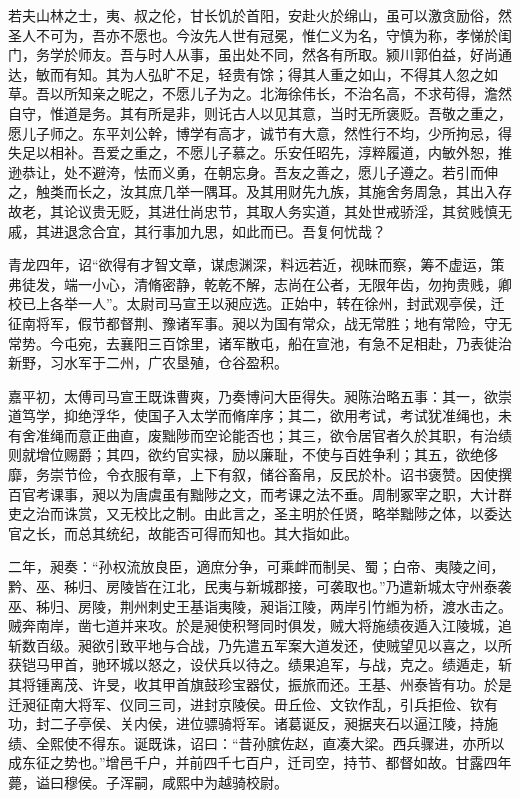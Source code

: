 \documentclass[12pt,UTF8]{ctexbook}
\begin{document}
若夫山林之士，夷、叔之伦，甘长饥於首阳，安赴火於绵山，虽可以激贪励俗，然圣人不可为，吾亦不愿也。今汝先人世有冠冕，惟仁义为名，守慎为称，孝悌於闺门，务学於师友。吾与时人从事，虽出处不同，然各有所取。颍川郭伯益，好尚通达，敏而有知。其为人弘旷不足，轻贵有馀；得其人重之如山，不得其人忽之如草。吾以所知亲之昵之，不愿儿子为之。北海徐伟长，不治名高，不求苟得，澹然自守，惟道是务。其有所是非，则讬古人以见其意，当时无所褒贬。吾敬之重之，愿儿子师之。东平刘公幹，博学有高才，诚节有大意，然性行不均，少所拘忌，得失足以相补。吾爱之重之，不愿儿子慕之。乐安任昭先，淳粹履道，内敏外恕，推逊恭让，处不避洿，怯而义勇，在朝忘身。吾友之善之，愿儿子遵之。若引而伸之，触类而长之，汝其庶几举一隅耳。及其用财先九族，其施舍务周急，其出入存故老，其论议贵无贬，其进仕尚忠节，其取人务实道，其处世戒骄淫，其贫贱慎无戚，其进退念合宜，其行事加九思，如此而已。吾复何忧哉？

青龙四年，诏“欲得有才智文章，谋虑渊深，料远若近，视昧而察，筹不虚运，策弗徒发，端一小心，清脩密静，乾乾不解，志尚在公者，无限年齿，勿拘贵贱，卿校已上各举一人”。太尉司马宣王以昶应选。正始中，转在徐州，封武观亭侯，迁征南将军，假节都督荆、豫诸军事。昶以为国有常众，战无常胜；地有常险，守无常势。今屯宛，去襄阳三百馀里，诸军散屯，船在宣池，有急不足相赴，乃表徙治新野，习水军于二州，广农垦殖，仓谷盈积。

嘉平初，太傅司马宣王既诛曹爽，乃奏博问大臣得失。昶陈治略五事：其一，欲崇道笃学，抑绝浮华，使国子入太学而脩庠序；其二，欲用考试，考试犹准绳也，未有舍准绳而意正曲直，废黜陟而空论能否也；其三，欲令居官者久於其职，有治绩则就增位赐爵；其四，欲约官实禄，励以廉耻，不使与百姓争利；其五，欲绝侈靡，务崇节俭，令衣服有章，上下有叙，储谷畜帛，反民於朴。诏书褒赞。因使撰百官考课事，昶以为唐虞虽有黜陟之文，而考课之法不垂。周制冢宰之职，大计群吏之治而诛赏，又无校比之制。由此言之，圣主明於任贤，略举黜陟之体，以委达官之长，而总其统纪，故能否可得而知也。其大指如此。

二年，昶奏：“孙权流放良臣，適庶分争，可乘衅而制吴、蜀；白帝、夷陵之间，黔、巫、秭归、房陵皆在江北，民夷与新城郡接，可袭取也。”乃遣新城太守州泰袭巫、秭归、房陵，荆州刺史王基诣夷陵，昶诣江陵，两岸引竹縆为桥，渡水击之。贼奔南岸，凿七道并来攻。於是昶使积弩同时俱发，贼大将施绩夜遁入江陵城，追斩数百级。昶欲引致平地与合战，乃先遣五军案大道发还，使贼望见以喜之，以所获铠马甲首，驰环城以怒之，设伏兵以待之。绩果追军，与战，克之。绩遁走，斩其将锺离茂、许旻，收其甲首旗鼓珍宝器仗，振旅而还。王基、州泰皆有功。於是迁昶征南大将军、仪同三司，进封京陵侯。毌丘俭、文钦作乱，引兵拒俭、钦有功，封二子亭侯、关内侯，进位骠骑将军。诸葛诞反，昶据夹石以逼江陵，持施绩、全熙使不得东。诞既诛，诏曰：“昔孙膑佐赵，直凑大梁。西兵骤进，亦所以成东征之势也。”增邑千户，并前四千七百户，迁司空，持节、都督如故。甘露四年薨，谥曰穆侯。子浑嗣，咸熙中为越骑校尉。
\end{document}
